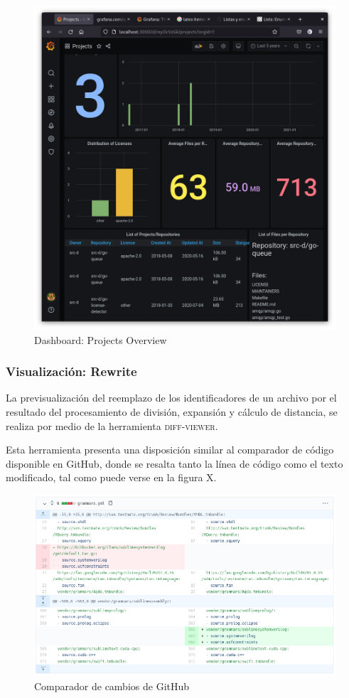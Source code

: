 \begin{figure}[H]
  \includegraphics[width=12cm]{implementation/dashboard_projects_overview.png}
  \centering
  \caption{Dashboard: Projects Overview}
\end{figure}

\subsubsection{Visualización: Rewrite}

La previsualización del reemplazo de los identificadores de un archivo
por el resultado del procesamiento de división, expansión y cálculo de distancia,
se realiza por medio de la herramienta \textsc{diff-viewer}.

Esta herramienta presenta una disposición similar al comparador de código
disponible en GitHub, donde se resalta tanto la línea de código como el texto modificado,
tal como puede verse en la figura X.

\begin{figure}[H]
  \includegraphics[width=12cm]{implementation/github_comparator.png}
  \centering
  \caption{Comparador de cambios de GitHub}
\end{figure}

